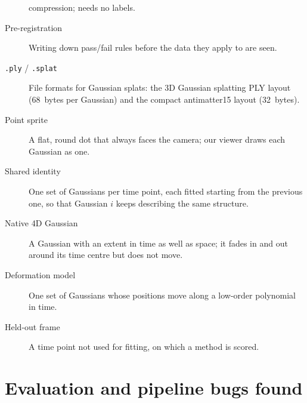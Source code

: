 \begin{description}
    compression; needs no labels.
  \item[Pre-registration] Writing down pass/fail rules before the data they apply to are seen.
  \item[\texttt{.ply} / \texttt{.splat}] File formats for Gaussian splats: the 3D Gaussian
    splatting PLY layout (68~bytes per Gaussian) and the compact antimatter15 layout (32~bytes).
  \item[Point sprite] A flat, round dot that always faces the camera; our viewer draws each
    Gaussian as one.
  \item[Shared identity] One set of Gaussians per time point, each fitted starting from the
    previous one, so that Gaussian $i$ keeps describing the same structure.
  \item[Native 4D Gaussian] A Gaussian with an extent in time as well as space; it fades in and
    out around its time centre but does not move.
  \item[Deformation model] One set of Gaussians whose positions move along a low-order
    polynomial in time.
  \item[Held-out frame] A time point not used for fitting, on which a method is scored.
\end{description}

\section{Evaluation and pipeline bugs found}\label{app:bugs}

